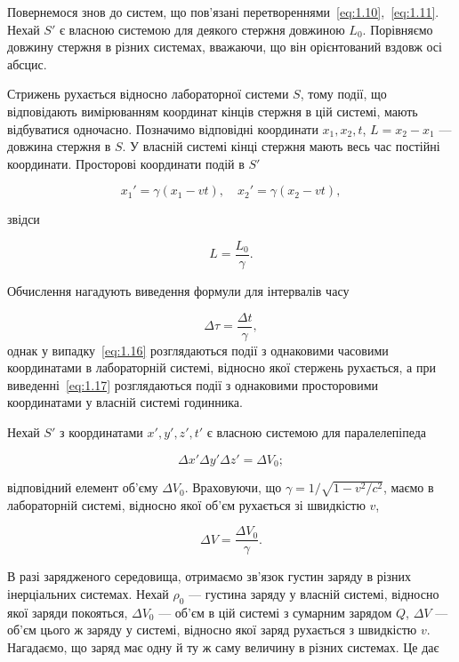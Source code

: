 Повернемося знов до систем, що пов’язані перетвореннями~\eqref{eq:1.10},~\eqref{eq:1.11}. Нехай $S'$ є власною системою для деякого стержня довжиною $L_0$. Порівняємо довжину стержня в різних системах, вважаючи, що він орієнтований вздовж осі абсцис.

Стрижень рухається відносно лабораторної системи $S$, тому події, що відповідають вимірюванням координат кінців стержня в цій системі, мають відбуватися одночасно. Позначимо відповідні координати $x_1, x_2, t$, $L = x_2 - x_1$ --- довжина стержня в $S$. У власній системі кінці стержня мають весь час постійні координати. Просторові координати подій в $S'$

\[
x_1' = \gamma (x_1 - v t), \quad x_2' = \gamma (x_2 - v t),
\]

звідси

\begin{equation}
L = \frac{L_0}{\gamma}.
\label{eq:1.16}
\end{equation}

Обчислення нагадують виведення формули для інтервалів часу

\begin{equation}
\Delta \tau = \frac{\Delta t}{\gamma},
\label{eq:1.17}
\end{equation}
%
однак у випадку~\eqref{eq:1.16} розглядаються події з однаковими часовими координатами в лабораторній системі, відносно якої стержень рухається, а при виведенні~\eqref{eq:1.17} розглядаються події з однаковими просторовими координатами у власній системі годинника.

Нехай $S'$ з координатами $x',y',z',t'$ є власною системою для паралелепіпеда

\[
\Delta x' \Delta y' \Delta z' = \Delta V_0;
\]

відповідний елемент об’єму $\Delta V_0$. Враховуючи, що $\gamma = 1/\sqrt{1 - v^2/c^2}$, маємо в лабораторній системі, відносно якої об'єм рухається зі швидкістю $v$,

\begin{equation}
\Delta V = \frac{\Delta V_0}{\gamma}.
\label{eq:1.18}
\end{equation}

В разі зарядженого середовища, отримаємо зв'язок густин заряду в різних інерціальних системах. Нехай $\rho_0$ --- густина заряду у власній системі, відносно якої заряди покояться, $\Delta V_0$ --- об’єм в цій системі з сумарним зарядом $Q$, $\Delta V$ --- об’єм цього ж заряду у системі, відносно якої заряд рухається з швидкістю $v$. Нагадаємо, що заряд має одну й ту ж саму величину в різних системах. Це дає

